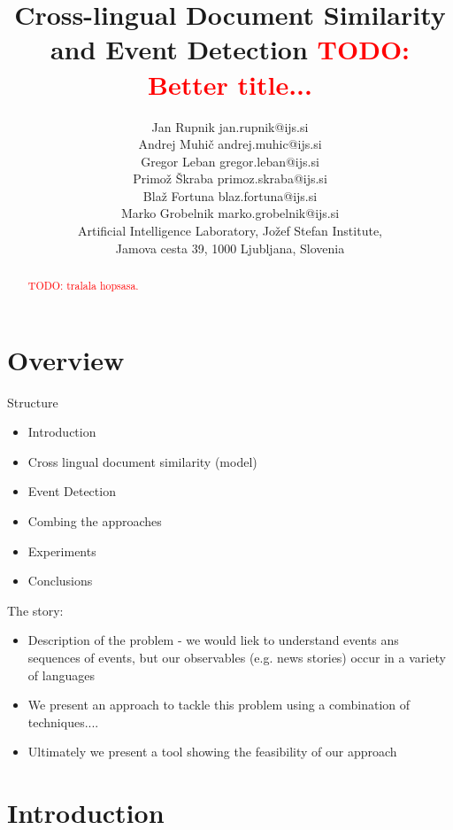 \documentclass[twoside,11pt]{article}
\newcommand{\todo}[1]{\textcolor{red}{TODO: #1}}
\begin{document}
\title{Cross-lingual Document Similarity and Event Detection \todo{Better title...}}

\author{\name Jan Rupnik \email jan.rupnik@ijs.si \\
       \name Andrej Muhi\v{c} \email andrej.muhic@ijs.si \\
       \name Gregor Leban \email gregor.leban@ijs.si \\
       \name Primo\v{z} \v{S}kraba \email primoz.skraba@ijs.si \\
       \name Bla\v{z} Fortuna \email blaz.fortuna@ijs.si \\
       \name Marko Grobelnik \email marko.grobelnik@ijs.si \\
       \addr Artificial Intelligence Laboratory, Jo\v{z}ef Stefan Institute,\\
       Jamova cesta 39, 1000 Ljubljana, Slovenia}

\maketitle

\begin{abstract}
\todo{tralala hopsasa.}
\end{abstract}
\section{Overview}
Structure
\begin{itemize}
\item Introduction
\item Cross lingual document similarity (model)
\item  Event Detection
\item  Combing the approaches
\item Experiments
\item Conclusions
\end{itemize}
The story:
\begin{itemize}
\item Description of the problem - we would liek to understand events ans sequences of events, but our observables (e.g. news stories) occur in a variety of languages
\item We present an approach to tackle this problem using a combination of techniques....
\item Ultimately we present a tool showing the feasibility of our approach
\end{itemize}

\section{Introduction}
\end{document}
